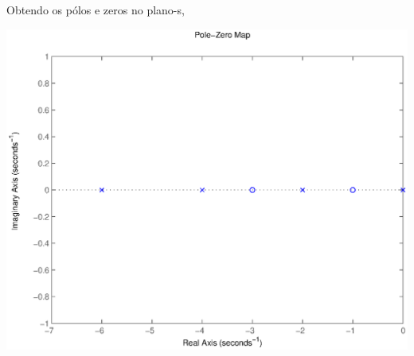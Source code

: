 \documentclass[a4paper, 10pt]{article}
\begin{document}
\begin{list}{\textbf{Questão .}}{
\setlength{\labelwidth}{-2mm} \setlength{\parsep}{0mm}
\setlength{\topsep}{0mm} \setlength{\leftmargin}{0mm}}
     Obtendo os pólos e zeros no plano-s,
        \begin{center}
                \includegraphics[scale=0.6]{fig3q.eps}
             \end{center}


\end{list}
\end{document}
